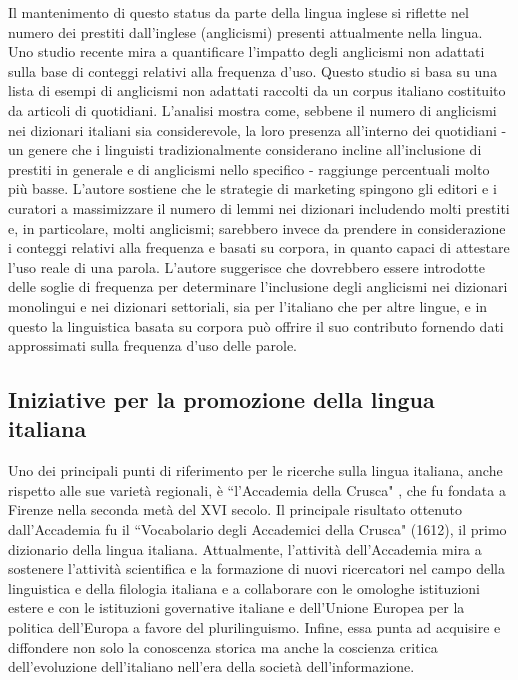 \documentclass[]{../../metanetpaper}
\begin{document}
\begin{multicols}{2}
Il mantenimento di questo status da parte della lingua inglese si riflette nel
numero dei prestiti dall'inglese (anglicismi) presenti attualmente nella
lingua. Uno studio recente \cite{Fischer} mira a quantificare l'impatto degli
anglicismi non adattati sulla base di conteggi relativi alla frequenza d'uso. 
Questo studio si basa su una lista di esempi di anglicismi non adattati
raccolti da un corpus italiano costituito da articoli di quotidiani. L'analisi
mostra come, sebbene il numero di anglicismi nei dizionari italiani sia
considerevole, la loro presenza all'interno dei quotidiani - un genere che i
linguisti tradizionalmente considerano incline all'inclusione di prestiti in
generale e di anglicismi nello specifico - raggiunge percentuali molto pi\`{u}
basse. L'autore sostiene che le strategie di marketing spingono gli editori e
i curatori a massimizzare il numero di lemmi nei dizionari includendo molti
prestiti e, in particolare, molti anglicismi; sarebbero invece da prendere in
considerazione i conteggi relativi alla frequenza e basati su corpora, in
quanto capaci di attestare l'uso reale di una parola. L'autore suggerisce che
dovrebbero essere introdotte delle soglie di frequenza per determinare
l'inclusione degli anglicismi nei dizionari monolingui e nei dizionari
settoriali, sia per l'italiano che per altre lingue, e in questo la
linguistica basata su corpora pu\`{o} offrire il suo contributo fornendo dati
approssimati sulla frequenza d'uso delle parole.



\subsection{Iniziative per la promozione della lingua italiana}

Uno dei principali punti di riferimento per le ricerche sulla lingua italiana,
anche rispetto alle sue variet\`{a} regionali, \`{e} “l'Accademia della
Crusca" \cite{Crusca}, che fu fondata a Firenze nella seconda met\`{a} del XVI
secolo. Il principale risultato ottenuto dall'Accademia fu il “Vocabolario
degli Accademici della Crusca" (1612), il primo dizionario della lingua
italiana. Attualmente, l'attivit\`{a} dell'Accademia mira a sostenere
l'attivit\`{a} scientifica e la formazione di nuovi ricercatori nel campo
della linguistica e della filologia italiana e a collaborare con le omologhe
istituzioni estere e con le istituzioni governative italiane e dell'Unione
Europea per la politica dell'Europa a favore del plurilinguismo. Infine, essa
punta ad acquisire e diffondere non solo la conoscenza storica ma anche la
coscienza critica dell'evoluzione dell'italiano nell'era della societ\`{a}
dell'informazione.




\end{multicols}
\end{document}
